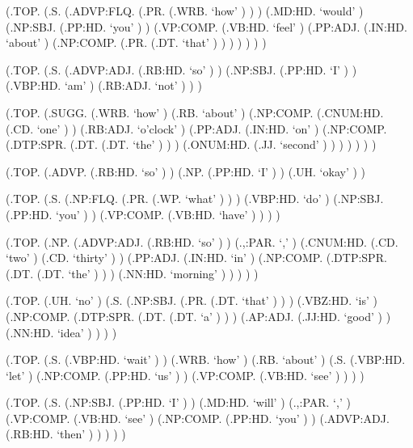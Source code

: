 \documentclass[10pt]{article}
\begin{document}
\begin{parsetree}  (.TOP. (.S. (.ADVP:FLQ. (.PR. (.WRB. `how' ) ) ) (.MD:HD. `would' ) (.NP:SBJ. (.PP:HD. `you' ) ) (.VP:COMP. (.VB:HD. `feel' ) (.PP:ADJ. (.IN:HD. `about' ) (.NP:COMP. (.PR. (.DT. `that' ) ) ) ) ) ) ) \end{parsetree}

\begin{parsetree}  (.TOP. (.S. (.ADVP:ADJ. (.RB:HD. `so' ) ) (.NP:SBJ. (.PP:HD. `I' ) ) (.VBP:HD. `am' ) (.RB:ADJ. `not' ) ) ) \end{parsetree}

\begin{parsetree}  (.TOP. (.SUGG. (.WRB. `how' ) (.RB. `about' ) (.NP:COMP. (.CNUM:HD. (.CD. `one' ) ) (.RB:ADJ. `o'clock' ) (.PP:ADJ. (.IN:HD. `on' ) (.NP:COMP. (.DTP:SPR. (.DT. (.DT. `the' ) ) ) (.ONUM:HD. (.JJ. `second' ) ) ) ) ) ) ) \end{parsetree}

\begin{parsetree}  (.TOP. (.ADVP. (.RB:HD. `so' ) ) (.NP. (.PP:HD. `I' ) ) (.UH. `okay' ) ) \end{parsetree}

\begin{parsetree}  (.TOP. (.S. (.NP:FLQ. (.PR. (.WP. `what' ) ) ) (.VBP:HD. `do' ) (.NP:SBJ. (.PP:HD. `you' ) ) (.VP:COMP. (.VB:HD. `have' ) ) ) ) \end{parsetree}

\begin{parsetree}  (.TOP. (.NP. (.ADVP:ADJ. (.RB:HD. `so' ) ) (.,:PAR. `,' ) (.CNUM:HD. (.CD. `two' ) (.CD. `thirty' ) ) (.PP:ADJ. (.IN:HD. `in' ) (.NP:COMP. (.DTP:SPR. (.DT. (.DT. `the' ) ) ) (.NN:HD. `morning' ) ) ) ) ) \end{parsetree}

\begin{parsetree}  (.TOP. (.UH. `no' ) (.S. (.NP:SBJ. (.PR. (.DT. `that' ) ) ) (.VBZ:HD. `is' ) (.NP:COMP. (.DTP:SPR. (.DT. (.DT. `a' ) ) ) (.AP:ADJ. (.JJ:HD. `good' ) ) (.NN:HD. `idea' ) ) ) ) \end{parsetree}

\begin{parsetree}  (.TOP. (.S. (.VBP:HD. `wait' ) ) (.WRB. `how' ) (.RB. `about' ) (.S. (.VBP:HD. `let' ) (.NP:COMP. (.PP:HD. `us' ) ) (.VP:COMP. (.VB:HD. `see' ) ) ) ) \end{parsetree}

\begin{parsetree}  (.TOP. (.S. (.NP:SBJ. (.PP:HD. `I' ) ) (.MD:HD. `will' ) (.,:PAR. `,' ) (.VP:COMP. (.VB:HD. `see' ) (.NP:COMP. (.PP:HD. `you' ) ) (.ADVP:ADJ. (.RB:HD. `then' ) ) ) ) ) \end{parsetree}
\end{document}
